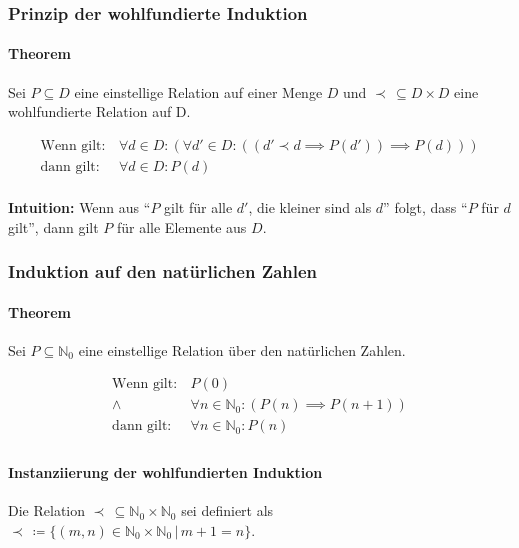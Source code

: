 \documentclass[a4paper, 11pt, accentcolor = tud3b]{tudreport}
\newcommand{\forwhich}{\ensuremath{{\,\vert\,}}}
\newcommand{\subsubparagraph}[1]{\hspace{1cm} \textbf{#1:}}
\newcommand{\intuition}[1]{\subsubparagraph{Intuition} #1}
\begin{document}
			    \subsubsection{Prinzip der wohlfundierte Induktion}
				    \paragraph{Theorem}
					    Sei $ P \subseteq D $ eine einstellige Relation auf einer Menge $ D $ und $ \prec \,\subseteq D \times D $ eine wohlfundierte Relation auf D.
					    
					    \begin{align*}
						    \text{Wenn gilt:} & \,\forall d \in D : (\forall d' \in D : ((d' \prec d \implies P(d')) \implies P(d))) \\
						    \text{dann gilt:} & \,\forall d \in D : P(d) \\
					    \end{align*}
				    
				    \intuition{Wenn aus \enquote{$ P $ gilt für alle $ d' $, die kleiner sind als $ d $} folgt, dass \enquote{$ P $ für $ d $ gilt}, dann gilt $ P $ für alle Elemente aus $ D $.}

			    \subsubsection{Induktion auf den natürlichen Zahlen}
				    \paragraph{Theorem}
					    Sei $ P \subseteq \mathbb{N} _ 0 $ eine einstellige Relation über den natürlichen Zahlen.
					    
					    \begin{align*}
						    \text{Wenn gilt:} & \,P(0) \\
						    \land & \,\forall n \in \mathbb{N} _ 0 : (P(n) \implies P(n + 1)) \\
						    \text{dann gilt:} & \,\forall n \in \mathbb{N} _ 0 : P(n) \\
					    \end{align*}
				    
				    \paragraph{Instanziierung der wohlfundierten Induktion}
					    Die Relation $ \prec \,\subseteq \mathbb{N} _ 0 \times \mathbb{N} _ 0 $ sei definiert als $ \prec \,\coloneqq \{ (m, n) \in \mathbb{N} _ 0 \times \mathbb{N} _ 0 \forwhich m + 1 = n \} $.
					    
\end{document}
